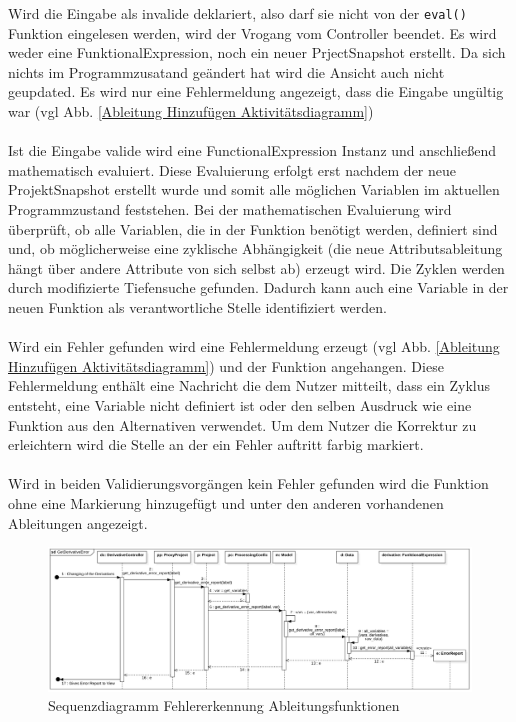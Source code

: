 \documentclass{article}
\begin{document}
Wird die Eingabe als invalide deklariert, also darf sie nicht von der \texttt{eval()} Funktion eingelesen werden, wird der Vrogang vom Controller beendet. Es wird weder eine FunktionalExpression, noch ein neuer PrjectSnapshot erstellt. Da sich nichts im Programmzusatand geändert hat wird die Ansicht auch nicht geupdated. Es wird nur eine Fehlermeldung angezeigt, dass die Eingabe ungültig war (vgl Abb. \ref{Ableitung Hinzufügen Aktivitätsdiagramm})
\\\\
Ist die Eingabe valide wird eine FunctionalExpression Instanz und anschließend mathematisch evaluiert. Diese Evaluierung erfolgt erst nachdem der neue ProjektSnapshot erstellt wurde und somit alle möglichen Variablen im aktuellen Programmzustand feststehen. Bei der mathematischen Evaluierung wird überprüft, ob alle Variablen, die in der Funktion benötigt werden, definiert sind und, ob möglicherweise eine zyklische Abhängigkeit (die neue Attributsableitung hängt über andere Attribute von sich selbst ab) erzeugt wird. Die Zyklen werden durch modifizierte Tiefensuche gefunden. Dadurch kann auch eine Variable in der neuen Funktion als verantwortliche Stelle identifiziert werden.
\\\\Wird ein Fehler gefunden wird eine Fehlermeldung erzeugt (vgl Abb. \ref{Ableitung Hinzufügen Aktivitätsdiagramm}) und der Funktion angehangen. Diese Fehlermeldung enthält eine Nachricht die dem Nutzer mitteilt, dass ein Zyklus entsteht, eine Variable nicht definiert ist oder den selben Ausdruck wie eine Funktion aus den Alternativen verwendet. Um dem Nutzer die Korrektur zu erleichtern wird die Stelle an der ein Fehler auftritt farbig markiert.\\\\
Wird in beiden Validierungsvorgängen kein Fehler gefunden wird die Funktion ohne eine Markierung hinzugefügt und unter den anderen vorhandenen Ableitungen angezeigt.
\\
\begin{figure}[H]%
    \centering
    \includegraphics[width=12cm]{entwurf/Floriane/GetDerivativeError.png}
    \caption{Sequenzdiagramm Fehlererkennung Ableitungsfunktionen}
    \label{Sequenzdiagramm Fehlererkennung Ableitungsfunktionen}
\end{figure}
\end{document}
